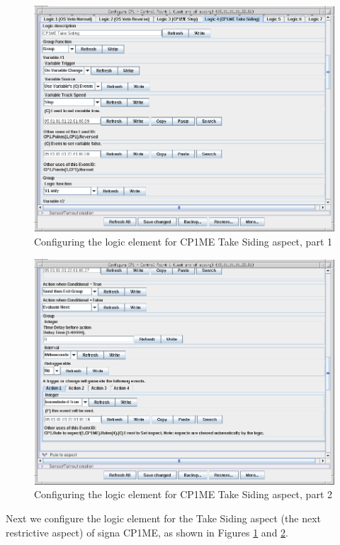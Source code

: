 \clearpage
\begin{figure}[hbpt]\begin{centering}%
\includegraphics[width=5in]{CP1ME-TakeSiding-Logic-Config1.png}
\caption{Configuring the logic element for CP1ME Take Siding aspect, part 1}
\label{fig:CP1ME-TakeSiding-Logic-Config1}
\end{centering}\end{figure}
\begin{figure}[hbpt]\begin{centering}%
\includegraphics[width=5in]{CP1ME-TakeSiding-Logic-Config2.png}
\caption{Configuring the logic element for CP1ME Take Siding aspect, part 2}
\label{fig:CP1ME-TakeSiding-Logic-Config2}
\end{centering}\end{figure}
Next we configure the logic element for the Take Siding aspect (the next 
restrictive aspect) of signa CP1ME, as shown in Figures 
\ref{fig:CP1ME-TakeSiding-Logic-Config1} and 
\ref{fig:CP1ME-TakeSiding-Logic-Config2}.
 

